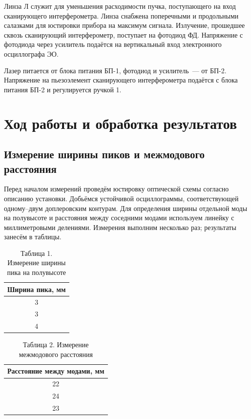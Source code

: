 \documentclass[a4paper]{article}
\begin{document}
Линза Л служит для уменьшения расходимости пучка, поступающего на вход сканирующего интерферометра. Линза снабжена поперечными и продольными салазками для юстировки прибора на максимум сигнала. Излучение, прошедшее сквозь сканирующий интерферометр, поступает на фотодиод ФД. Напряжение с фотодиода через усилитель подаётся на вертикальный вход электронного осциллографа ЭО.

Лазер питается от блока питания БП-1, фотодиод и усилитель~---
от БП-2. Напряжение на пьезоэлемент сканирующего интерферометра
подаётся с блока питания БП-2 и регулируется ручкой 1.


\section{Ход работы и обработка результатов}

\subsection{Измерение ширины пиков и межмодового расстояния}
Перед началом измерений проведём юстировку оптической схемы согласно описанию установки. Добьёмся устойчивой осциллограммы, соответствующей одному–двум доплеровским контурам. Для определения ширины отдельной моды на полувысоте и расстояния между соседними модами используем линейку с миллиметровыми делениями. Измерения выполним несколько раз; результаты занесём в таблицы.

\begin{table}[h]
\centering

\begin{tabular}{|c|}
\hline
Ширина пика, мм \\
\hline
3 \\
\hline
3 \\
\hline
4 \\
\hline
\end{tabular}
\caption{Таблица 1. Измерение ширины пика на полувысоте}
\end{table}

\begin{table}[h]
\centering

\begin{tabular}{|c|}
\hline
Расстояние между модами, мм \\
\hline
22 \\
\hline
24 \\
\hline
23 \\
\hline
\end{tabular}
\caption{Таблица 2. Измерение межмодового расстояния}
\end{table}
\end{document}
